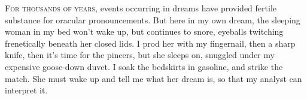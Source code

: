 
\lettrine{F}{or thousands of years,} events occurring in dreams have provided fertile
substance for oracular pronouncements. But here in my own dream, the
sleeping woman in my bed won't wake up, but continues to snore, eyeballs
twitching frenetically beneath her closed lids. I prod her with my
fingernail, then a sharp knife, then it's time for the pincers, but she
sleeps on, snuggled under my expensive goose-down duvet. I soak the
bedskirts in gasoline, and strike the match. She must wake up and tell
me what her dream is, so that my analyst can interpret it.


